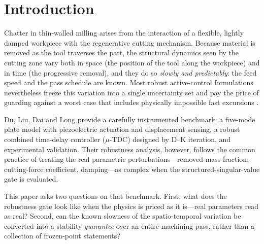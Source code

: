 \documentclass[preprint,12pt]{elsarticle}
\begin{document}
\section{Introduction}

Chatter in thin-walled milling arises from the interaction of a
flexible, lightly damped workpiece with the regenerative cutting
mechanism.  Because material is removed as the tool traverses the part,
the structural dynamics seen by the cutting zone vary both in space
(the position of the tool along the workpiece) and in time (the
progressive removal), and they do so \emph{slowly and predictably}: the
feed speed and the pass schedule are known.  Most robust active-control
formulations nevertheless freeze this variation into a single
uncertainty set and pay the price of guarding against a worst case
that includes physically impossible fast excursions
\cite{Munoa2016,Altintas1995}.

Du, Liu, Dai and Long \cite{Du2024} provide a carefully instrumented
benchmark: a five-mode plate model with piezoelectric actuation and
displacement sensing, a robust combined time-delay controller
($\mu$-TDC) designed by D--K iteration, and experimental validation.
Their robustness analysis, however, follows the common practice of
treating the real parametric perturbations---removed-mass fraction,
cutting-force coefficient, damping---as complex when the
structured-singular-value gate is evaluated.

This paper asks two questions on that benchmark.  First, what does the
robustness gate look like when the physics is priced as it is---real
parameters read as real?  Second, can the known slowness of the
spatio-temporal variation be converted into a stability
\emph{guarantee} over an entire machining pass, rather than a
collection of frozen-point statements?
\end{document}
